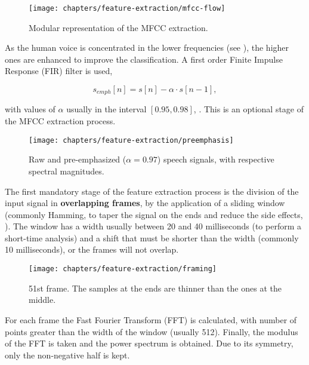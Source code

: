 \begin{figure}[ht]
    \centering
    \texttt{[image: chapters/feature-extraction/mfcc-flow]}
    \caption{Modular representation of the MFCC extraction.}
    \label{fig:mfcc-flow}
\end{figure}


As the human voice is concentrated in the lower frequencies (see ), the higher ones are enhanced to improve the classification. A first order Finite Impulse Response (FIR) filter is used,

\begin{equation}
    s_{emph}[n] = s[n] - \alpha \cdot s[n - 1],
    \label{eq:preemphasis}
\end{equation}

\noindent with values of $\alpha$ usually in the interval $[0.95, 0.98]$, . This is an optional stage of the MFCC extraction process.

\begin{figure}[ht]
    \centering
    \texttt{[image: chapters/feature-extraction/preemphasis]}
    \caption{Raw and pre-emphasized ($\alpha = 0.97$) speech signals, with respective spectral magnitudes.}
    \label{fig:preemphasis}
\end{figure}


The first mandatory stage of the feature extraction process is the division of the input signal in \textbf{overlapping frames}, by the application of a sliding window (commonly Hamming, to taper the signal on the ends and reduce the side effects, ). The window has a width usually between 20 and 40 milliseconds (to perform a short-time analysis) and a shift that must be shorter than the width (commonly 10 milliseconds), or the frames will not overlap.

\begin{figure}[ht]
    \centering
    \texttt{[image: chapters/feature-extraction/framing]}
    \caption{51st frame. The samples at the ends are thinner than the ones at the middle.}
    \label{fig:framing}
\end{figure}


For each frame the Fast Fourier Transform (FFT) is calculated, with number of points greater than the width of the window (usually 512). Finally, the modulus of the FFT is taken and the power spectrum is obtained. Due to its symmetry, only the non-negative half is kept.

